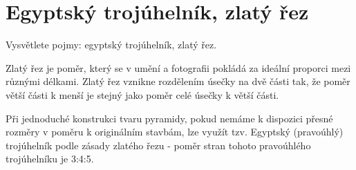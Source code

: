 \section{Egyptský trojúhelník, zlatý řez}
Vysvětlete pojmy: egyptský trojúhelník, zlatý řez.

Zlatý řez je poměr, který se v umění a fotografii pokládá za ideální proporci mezi různými délkami. Zlatý řez vznikne 
rozdělením úsečky na dvě části tak, že poměr větší části k menší je stejný jako poměr celé úsečky k větší části.

Při jednoduché konstrukci tvaru pyramidy, pokud nemáme k dispozici přesné rozměry v poměru k originálním stavbám, lze 
využít tzv. Egyptský (pravoúhlý) trojúhelník podle zásady zlatého řezu - poměr stran tohoto pravoúhlého trojúhelníku je 
3:4:5.
